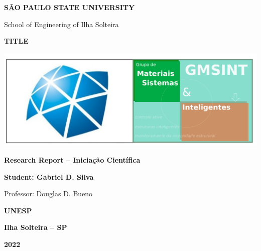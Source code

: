 \begin{titlepage}
    \sffamily
    \begin{center}
     {\LARGE \bfseries SÃO PAULO STATE UNIVERSITY}
     
     {\LARGE School of Engineering of Ilha Solteira}
     
     \vfill
     
     {\Huge \bfseries TITLE}
     
     \vfill
     
     \includegraphics[width=\textwidth]{figures/logos/gmsint_logo.pdf}
     
     \vfill
     
     \begin{minipage}{0.7\textwidth}\centering
      {\large \bfseries Research Report -- Iniciação Científica}
      
      {\large \bfseries Student: Gabriel D. Silva}
      
      {\large Professor: Douglas D. Bueno}
      
     \end{minipage}
     
     \vfill
     
     {\large \bfseries UNESP}
     
     {\large \bfseries Ilha Solteira -- SP}
     
     {\large \bfseries 2022}
    \end{center}
   \end{titlepage}